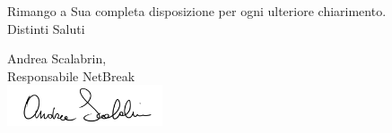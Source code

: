 \documentclass[11pt,a4paper]{letter}
\begin{document}
\begin{letter}
\noindent Rimango a Sua completa disposizione per ogni ulteriore chiarimento.\\
Distinti Saluti
	

\closing{Andrea Scalabrin,\\ Responsabile NetBreak\\ \includegraphics[width=1.8in]{AS.png}}


\end{letter}
\end{document}
